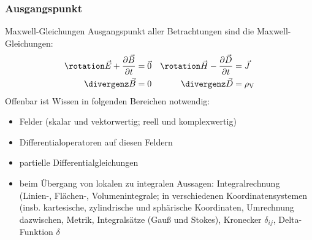 \begin{frame}
  \frametitle{Ausgangspunkt}

  \begin{block}{Maxwell-Gleichungen}
    Ausgangspunkt aller Betrachtungen sind die
    \alert{Maxwell-Gleichungen}:
    \begin{align*}
      \rotation \vec{E} + \frac{\partial
      \vec{B}}{\partial t} &= \vec{0} &
                                  \rotation\vec{H}-\frac{\partial\vec{D}}{\partial
                                  t}&=\vec{J} \\
      \divergenz\vec{B}&=0 & \divergenz\vec{D}&=\rho_\text{V}
    \end{align*} \pause
    Offenbar ist Wissen in folgenden Bereichen notwendig:
    \begin{itemize}[<+->]
    \item Felder (skalar und vektorwertig; reell und
      komplexwertig)
    \item Differentialoperatoren auf diesen
      Feldern
    \item partielle Differentialgleichungen
    \item beim Übergang von lokalen zu
      integralen Aussagen: Integralrechnung
      (Linien-, Flächen-, Volumenintegrale; in
      verschiedenen Koordinatensystemen
      (insb. kartesische, zylindrische und
      sphärische Koordinaten, Umrechnung
      dazwischen, Metrik, Integralsätze (Gauß
      und Stokes), Kronecker $\delta_{ij}$,
      Delta-Funktion $\delta$
    \end{itemize}

    
  \end{block}
\end{frame}

